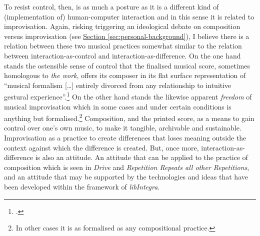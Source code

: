 To resist control, then, is as much a posture as it is a different kind of (implementation of) human-computer interaction and in this sense it is related to improvisation. Again, risking triggering an ideological debate on composition versus improvisation (see \hyperref[sec:personal-background]{Section \ref*{sec:personal-background}}), I believe there is a relation between these two musical practices somewhat similar to the relation between interaction-as-control and interaction-as-difference. On the one hand stands the ostensible sense of control that the finalised musical score, sometimes homologous to \emph{the work}, offers its composer in its flat surface representation of ``musical formalism [\ldots] entirely divorced from any relationship to intuitive gestural experience''.\footcite[35]{wis96} On the other hand stands the likewise apparent \emph{freedom} of musical improvisation which in some cases and under certain conditions is anything but formalised.\footnote{In other cases it is as formalised as any compositional practice.} Composition, and the printed score, as a means to gain control over one's own music, to make it tangible, archivable and sustainable. Improvisation as a practice to create differences that loses meaning outside the context against which the difference is created. But, once more, interaction-as-difference is also an attitude. An attitude that can be applied to the practice of composition which is seen in \emph{Drive} and 
\emph{Repetition Repeats all other Repetitions}, and an attitude that may be supported by the technologies and ideas that have been developed within the framework of \emph{libIntegra}. 

